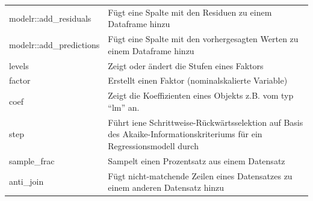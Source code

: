 \documentclass[12pt,ngerman,]{book}
\theoremstyle{definition}
\theoremstyle{definition}
\theoremstyle{remark}
\begin{document}
\begin{longtable}[]{@{}ll@{}}
\begin{minipage}[t]{0.34\columnwidth}
modelr::add\_residuals\strut
\end{minipage} & \begin{minipage}[t]{0.43\columnwidth}\raggedright\strut
Fügt eine Spalte mit den Residuen zu einem Dataframe hinzu\strut
\end{minipage}\tabularnewline
\begin{minipage}[t]{0.34\columnwidth}\raggedright\strut
modelr::add\_predictions\strut
\end{minipage} & \begin{minipage}[t]{0.43\columnwidth}\raggedright\strut
Fügt eine Spalte mit den vorhergesagten Werten zu einem Dataframe
hinzu\strut
\end{minipage}\tabularnewline
\begin{minipage}[t]{0.34\columnwidth}\raggedright\strut
levels\strut
\end{minipage} & \begin{minipage}[t]{0.43\columnwidth}\raggedright\strut
Zeigt oder ändert die Stufen eines Faktors\strut
\end{minipage}\tabularnewline
\begin{minipage}[t]{0.34\columnwidth}\raggedright\strut
factor\strut
\end{minipage} & \begin{minipage}[t]{0.43\columnwidth}\raggedright\strut
Erstellt einen Faktor (nominalskalierte Variable)\strut
\end{minipage}\tabularnewline
\begin{minipage}[t]{0.34\columnwidth}\raggedright\strut
coef\strut
\end{minipage} & \begin{minipage}[t]{0.43\columnwidth}\raggedright\strut
Zeigt die Koeffizienten eines Objekts z.B. vom typ ``lm'' an.\strut
\end{minipage}\tabularnewline
\begin{minipage}[t]{0.34\columnwidth}\raggedright\strut
step\strut
\end{minipage} & \begin{minipage}[t]{0.43\columnwidth}\raggedright\strut
Führt iene Schrittweise-Rückwärtsselektion auf Basis des
Akaike-Informationskriteriums für ein Regressionsmodell durch\strut
\end{minipage}\tabularnewline
\begin{minipage}[t]{0.34\columnwidth}\raggedright\strut
sample\_frac\strut
\end{minipage} & \begin{minipage}[t]{0.43\columnwidth}\raggedright\strut
Sampelt einen Prozentsatz aus einem Datensatz\strut
\end{minipage}\tabularnewline
\begin{minipage}[t]{0.34\columnwidth}\raggedright\strut
anti\_join\strut
\end{minipage} & \begin{minipage}[t]{0.43\columnwidth}\raggedright\strut
Fügt nicht-matchende Zeilen eines Datensatzes zu einem anderen Datensatz
hinzu\strut
\end{minipage}\tabularnewline
\bottomrule
\end{longtable}
\end{document}
